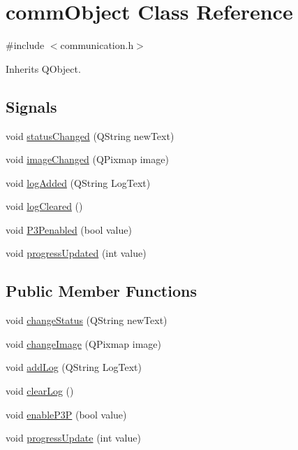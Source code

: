 \hypertarget{classcomm_object}{}\section{comm\+Object Class Reference}
\label{classcomm_object}


{\ttfamily \#include $<$communication.\+h$>$}



Inherits Q\+Object.

\subsection*{Signals}
\begin{DoxyCompactItemize}
\item 
void \hyperlink{classcomm_object_adccf5b5946d35d5cf6d76f367f93e335}{status\+Changed} (Q\+String new\+Text)
\item 
void \hyperlink{classcomm_object_a3828eab6be234f6216a6f80a6a82e41e}{image\+Changed} (Q\+Pixmap image)
\item 
void \hyperlink{classcomm_object_a72620fe1bac16309baf6d148644edaf9}{log\+Added} (Q\+String Log\+Text)
\item 
void \hyperlink{classcomm_object_af2304085624c26230e9d930d616e3e19}{log\+Cleared} ()
\item 
void \hyperlink{classcomm_object_af369de87a7f2c9b7170223bedd6c08d9}{P3\+Penabled} (bool value)
\item 
void \hyperlink{classcomm_object_a6039d306f25a6b46c78942edf9cee662}{progress\+Updated} (int value)
\end{DoxyCompactItemize}
\subsection*{Public Member Functions}
\begin{DoxyCompactItemize}
\item 
void \hyperlink{classcomm_object_a1f4b8dd22ecc46bab619f6b1fe1a5144}{change\+Status} (Q\+String new\+Text)
\item 
void \hyperlink{classcomm_object_a6f81522c2aa1668fa402f08710e6206b}{change\+Image} (Q\+Pixmap image)
\item 
void \hyperlink{classcomm_object_aec354c7099b3039083cc4224e071e022}{add\+Log} (Q\+String Log\+Text)
\item 
void \hyperlink{classcomm_object_a785f776d16f1871786bb88482fc4dd1f}{clear\+Log} ()
\item 
void \hyperlink{classcomm_object_a7552116eb5e18c49c6dcf943de29af7a}{enable\+P3P} (bool value)
\item 
void \hyperlink{classcomm_object_acfc97f4310e2b7d841ecb8cf8be0088e}{progress\+Update} (int value)
\end{DoxyCompactItemize}


